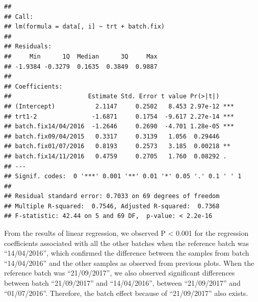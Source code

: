 \documentclass[
]{book}
\newenvironment{Shaded}{\begin{snugshade}}{\end{snugshade}}
\newcommand{\AttributeTok}[1]{\textcolor[rgb]{0.77,0.63,0.00}{#1}}
\newcommand{\CommentTok}[1]{\textcolor[rgb]{0.56,0.35,0.01}{\textit{#1}}}
\newcommand{\FunctionTok}[1]{\textcolor[rgb]{0.00,0.00,0.00}{#1}}
\newcommand{\NormalTok}[1]{#1}
\newcommand{\OtherTok}[1]{\textcolor[rgb]{0.56,0.35,0.01}{#1}}
\newcommand{\SpecialCharTok}[1]{\textcolor[rgb]{0.00,0.00,0.00}{#1}}
\newcommand{\StringTok}[1]{\textcolor[rgb]{0.31,0.60,0.02}{#1}}
\begin{document}
\begin{Shaded}
\end{Shaded}

\begin{verbatim}
## 
## Call:
## lm(formula = data[, i] ~ trt + batch.fix)
## 
## Residuals:
##     Min      1Q  Median      3Q     Max 
## -1.9384 -0.3279  0.1635  0.3849  0.9887 
## 
## Coefficients:
##                     Estimate Std. Error t value Pr(>|t|)    
## (Intercept)           2.1147     0.2502   8.453 2.97e-12 ***
## trt1-2               -1.6871     0.1754  -9.617 2.27e-14 ***
## batch.fix14/04/2016  -1.2646     0.2690  -4.701 1.28e-05 ***
## batch.fix09/04/2015   0.3317     0.3139   1.056  0.29446    
## batch.fix01/07/2016   0.8193     0.2573   3.185  0.00218 ** 
## batch.fix14/11/2016   0.4759     0.2705   1.760  0.08292 .  
## ---
## Signif. codes:  0 '***' 0.001 '**' 0.01 '*' 0.05 '.' 0.1 ' ' 1
## 
## Residual standard error: 0.7033 on 69 degrees of freedom
## Multiple R-squared:  0.7546, Adjusted R-squared:  0.7368 
## F-statistic: 42.44 on 5 and 69 DF,  p-value: < 2.2e-16
\end{verbatim}

From the results of linear regression, we observed P \textless{} 0.001 for the regression coefficients associated with all the other batches when the reference batch was ``14/04/2016'', which confirmed the difference between the samples from batch ``14/04/2016'' and the other samples as observed from previous plots. When the reference batch was ``21/09/2017'', we also observed significant differences between batch ``21/09/2017'' and ``14/04/2016'', between ``21/09/2017'' and ``01/07/2016''. Therefore, the batch effect because of ``21/09/2017'' also exists.
\end{document}
